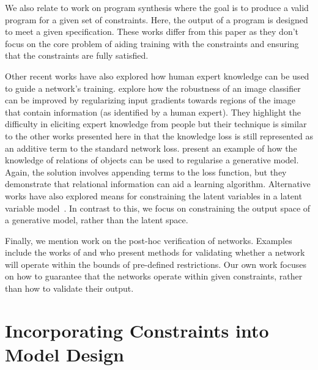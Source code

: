 \documentclass[letterpaper]{article} %
\begin{document}
We also relate to work  on program synthesis \citep{lezama2009sketching,jha2010oracle,yu2017component,osera2019constraint} where the goal is to produce a valid program for a given set of constraints.
Here, the output of a program is designed to meet a given specification. 
These works differ from this paper as they don’t focus on the core problem of aiding training with the constraints and ensuring that the constraints are fully satisfied.

Other recent works have also explored how human expert knowledge can be used to guide a network's training. 
\citet{ross2018improving,ross2017right} explore how the robustness of an image classifier can be improved by regularizing input gradients towards regions of the image that contain information (as identified by a human expert).
They highlight the difficulty in eliciting expert knowledge from people but their technique is similar to the other works presented here in that the knowledge loss is still represented as an additive term to the standard network loss.
\citet{takeishi2020Knowledge} present an example of how the knowledge of relations of objects can be used to regularise a generative model. 
Again, the solution involves appending terms to the loss function, but they demonstrate that relational information can aid a learning algorithm.
Alternative works have also explored means for constraining the latent variables in a latent variable model~\cite{ganchev2010posterior,ganchev2007expectation}. 
In contrast to this, we focus on constraining the output space of a generative model, rather than the latent space.

Finally, we mention work on the post-hoc verification of networks. 
Examples include the works of \citet{katz2017reluplex} and \citet{bunel2017unified} who present methods for validating whether a network will operate within the bounds of pre-defined restrictions. 
Our own work focuses on how to guarantee that the networks operate within given constraints, rather than how to validate their output. 


\section{Incorporating Constraints into Model Design}
\end{document}

